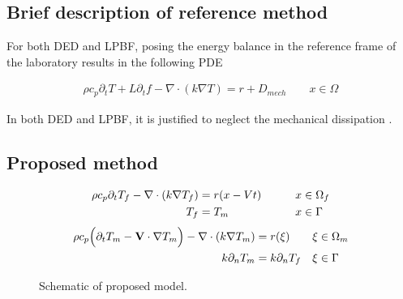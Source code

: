 \subsection{Brief description of reference method}
For both DED and LPBF,
posing the energy balance in the reference
frame of the laboratory results in the following PDE
\cite{Chiumenti2017}

\begin{align*}
  \rho c_p \partial_t T + L \partial_t f
  - \nabla \cdot (k \nabla T) = r + D_{mech}
  \qquad x \in \Omega
\end{align*}

In both DED and LPBF, it is justified to neglect
the mechanical dissipation \cite{Chiumenti2017, Patil2021}.

\subsection{Proposed method}
\begin{align}
  \label{eq:pdeddf}
  \rho c_p \partial_t T_f - \nabla \cdot (k \nabla T_f) &= r(x - Vt) \qquad &x &\in \Omega_f\\
  T_f &= T_m \qquad &x &\in \Gamma \notag
\end{align}
\begin{align}
  \label{eq:pdeddm}
  \rho c_p \Big( \partial_t T_m - \mathbf{V} \cdot \nabla T_m \Big) -
  \nabla \cdot ( k \nabla T_m) &= r(\xi)  &\xi &\in \Omega_m\\
  k \partial_n T_m &= k \partial_n T_f  &\xi &\in \Gamma \notag
\end{align}

\begin{figure}
  \caption{Schematic of proposed model.}
  \label{fig:schematic}
\end{figure}


\iffalse
Show reference model
Go over limitations
Introduce my model
\fi
